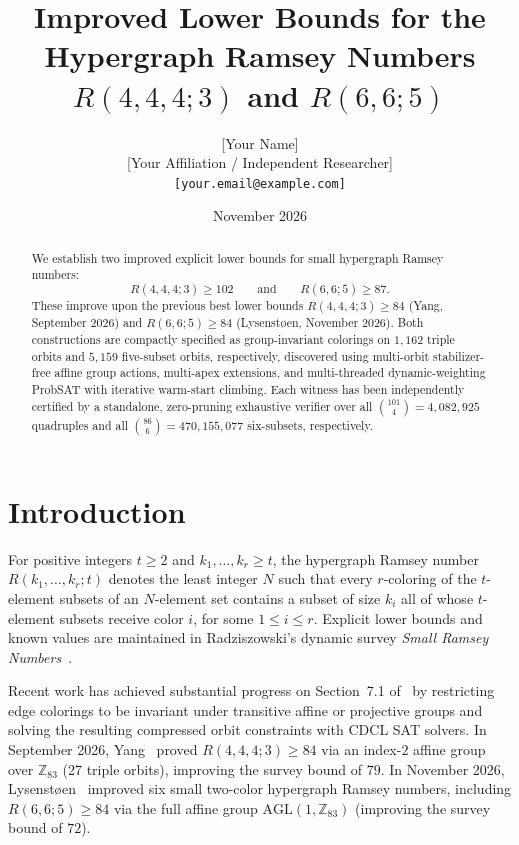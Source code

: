 \documentclass[11pt,a4paper]{article}
\title{Improved Lower Bounds for the Hypergraph Ramsey Numbers $R(4,4,4;3)$ and $R(6,6;5)$}
\author{[Your Name]\\
\small [Your Affiliation / Independent Researcher]\\
\small \texttt{[your.email@example.com]}}
\date{November 2026}
\begin{document}
\maketitle

\begin{abstract}
We establish two improved explicit lower bounds for small hypergraph Ramsey numbers:
\[
R(4,4,4;3) \ge 102 \qquad \text{and} \qquad R(6,6;5) \ge 87.
\]
These improve upon the previous best lower bounds $R(4,4,4;3) \ge 84$ (Yang, September 2026) and $R(6,6;5) \ge 84$ (Lysenst\o en, November 2026). Both constructions are compactly specified as group-invariant colorings on $1{,}162$ triple orbits and $5{,}159$ five-subset orbits, respectively, discovered using multi-orbit stabilizer-free affine group actions, multi-apex extensions, and multi-threaded dynamic-weighting ProbSAT with iterative warm-start climbing. Each witness has been independently certified by a standalone, zero-pruning exhaustive verifier over all $\binom{101}{4} = 4{,}082{,}925$ quadruples and all $\binom{86}{6} = 470{,}155{,}077$ six-subsets, respectively.
\end{abstract}

\section{Introduction}
For positive integers $t \ge 2$ and $k_1, \dots, k_r \ge t$, the hypergraph Ramsey number $R(k_1, \dots, k_r; t)$ denotes the least integer $N$ such that every $r$-coloring of the $t$-element subsets of an $N$-element set contains a subset of size $k_i$ all of whose $t$-element subsets receive color $i$, for some $1 \le i \le r$. Explicit lower bounds and known values are maintained in Radziszowski's dynamic survey \emph{Small Ramsey Numbers}~\cite{RadziszowskiDS1}.

Recent work has achieved substantial progress on Section~7.1 of~\cite{RadziszowskiDS1} by restricting edge colorings to be invariant under transitive affine or projective groups and solving the resulting compressed orbit constraints with CDCL SAT solvers. In September 2026, Yang~\cite{Yang2026} proved $R(4,4,4;3) \ge 84$ via an index-$2$ affine group over $\mathbb{Z}_{83}$ (27 triple orbits), improving the survey bound of $79$. In November 2026, Lysenst\o en~\cite{Lysenstoen2026} improved six small two-color hypergraph Ramsey numbers, including $R(6,6;5) \ge 84$ via the full affine group $\mathrm{AGL}(1,\mathbb{Z}_{83})$ (improving the survey bound of $72$).
\end{document}
